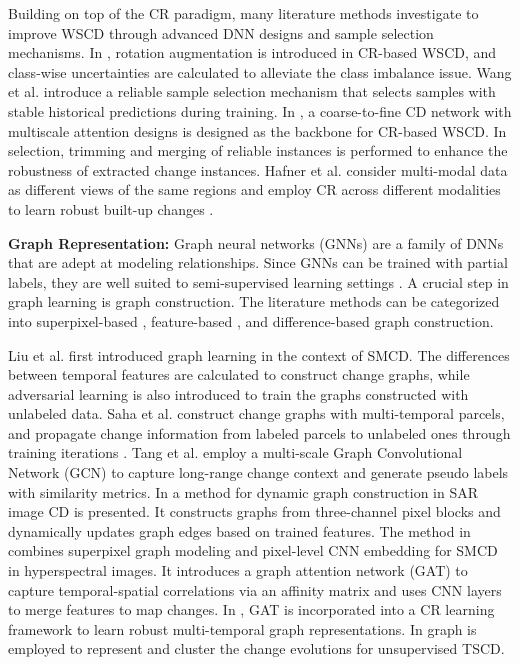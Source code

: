 Building on top of the CR paradigm, many literature methods investigate to improve WSCD through advanced DNN designs and sample selection mechanisms. In \cite{zhang2023joint}, rotation augmentation is introduced in CR-based WSCD, and class-wise uncertainties are calculated to alleviate the class imbalance issue. Wang et al. \cite{wang2024stcrnet} introduce a reliable sample selection mechanism that selects samples with stable historical predictions during training. In \cite{han2024c2fsemicd}, a coarse-to-fine CD network with multiscale attention designs is designed as the backbone for CR-based WSCD. In \cite{zuo2024robust} selection, trimming and merging of reliable instances is performed to enhance the robustness of extracted change instances. Hafner et al. consider multi-modal data as different views of the same regions and employ CR across different modalities to learn robust built-up changes \cite{hafner2023semisupervised}.

\textbf{Graph Representation:} Graph neural networks (GNNs) are a family of DNNs that are adept at modeling relationships. Since GNNs can be trained with partial labels, they are well suited to semi-supervised learning settings \cite{liu2019semisupervised, saha2021semisupervised}. A crucial step in graph learning is graph construction. The literature methods can be categorized into superpixel-based \cite{saha2021semisupervised, wang2021dynamic, lin2023hyperspectral}, feature-based \cite{sun2022semisanet}, and difference-based \cite{liu2019semisupervised, tang2022unsupervised} graph construction. 

Liu et al. \cite{liu2019semisupervised} first introduced graph learning in the context of SMCD. The differences between temporal features are calculated to construct change graphs, while adversarial learning is also introduced to train the graphs constructed with unlabeled data. Saha et al. construct change graphs with multi-temporal parcels, and propagate change information from labeled parcels to unlabeled ones through training iterations \cite{saha2021semisupervised}. Tang et al. \cite{tang2022unsupervised} employ a multi-scale Graph Convolutional Network (GCN) to capture long-range change context and generate pseudo labels with similarity metrics. In \cite{wang2021dynamic} a method for dynamic graph construction in SAR image CD is presented. It constructs graphs from three-channel pixel blocks and dynamically updates graph edges based on trained features. The method in \cite{lin2023hyperspectral} combines superpixel graph modeling and pixel-level CNN embedding for SMCD in hyperspectral images. It introduces a graph attention network (GAT) to capture temporal-spatial correlations via an affinity matrix and uses CNN layers to merge features to map changes. In \cite{sun2022semisanet}, GAT is incorporated into a CR learning framework to learn robust multi-temporal graph representations. In \cite{kalinicheva2020unsupervised} graph is employed to represent and cluster the change evolutions for unsupervised TSCD.


